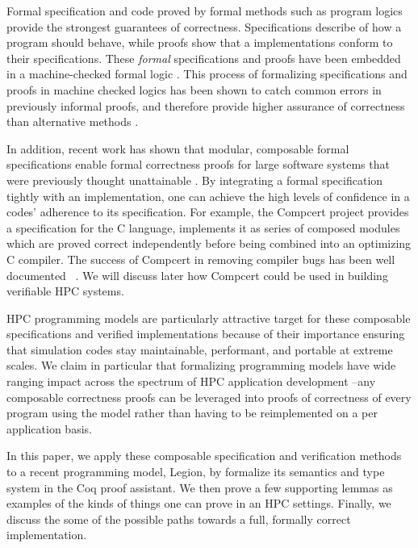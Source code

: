 \documentclass[sigconf]{acmart}
\begin{document}
Formal specification and code proved by formal methods such as program logics
provide the strongest guarantees of correctness. Specifications describe of how a program
should behave, while proofs show that a implementations conform to
their specifications. These \emph{formal} specifications and proofs 
have been embedded in a machine-checked formal
logic \cite{bertot2013interactive, nipkow2002isabelle, pfenning1999system,
jackson1994nuprl}. This process of formalizing specifications and proofs in
machine checked logics has been shown to catch common errors in previously
informal proofs, and therefore provide higher 
assurance of correctness than alternative methods \cite{clarke1996formal,
yang2011finding}.

In addition, recent work has shown that modular, composable formal
specifications enable formal correctness proofs for large software systems that
were previously thought unattainable \cite{weng2016deepspec}. By integrating a formal
specification tightly with an implementation, one can achieve the high
levels of confidence in a codes' adherence to its
specification\cite{weng2016deepspec}. For example, the Compcert project
provides a specification for the C language, implements it as series of
composed modules which are proved correct independently before being combined
into an optimizing C compiler. The success of Compcert in removing compiler bugs has been well
documented ~\cite{leroy2012compcert}. We will discuss later how Compcert could be used in building
verifiable HPC systems.

HPC programming models are particularly attractive target for these composable
specifications and verified implementations because of their importance 
ensuring that simulation codes stay maintainable, performant, and portable at
extreme scales\cite{diaz2012survey}.
We claim in particular that formalizing programming models have wide ranging
impact across the spectrum of HPC application development --any composable correctness
proofs can be leveraged into proofs of correctness of every program using the
model rather than having to be reimplemented on a per application basis.

In this paper, we apply these composable specification and verification methods
to a recent programming model, Legion, by formalize its
semantics and type system in the Coq proof assistant. We then prove a few supporting lemmas as examples of
the kinds of things one can prove in an HPC settings. Finally, we discuss the
some of the possible paths towards a full, formally correct implementation.
\end{document}

